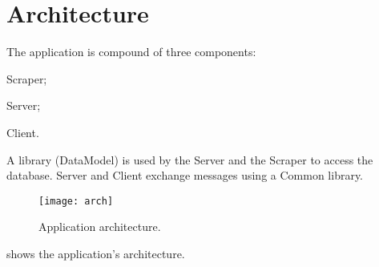 \chapter{Architecture}\label{ch:arch}

The application is compound of three components:
\begin{enumerate*}[label=]
	\item Scraper;
	\item Server;
	\item Client.
\end{enumerate*}
A library (DataModel) is used by the Server and the Scraper to access the
database. Server and Client exchange messages using a Common library.

\begin{figure}[p]
	\texttt{[image: arch]}
	\caption{Application architecture.}\label{fig:arch}
\end{figure}

 shows the application's architecture.







